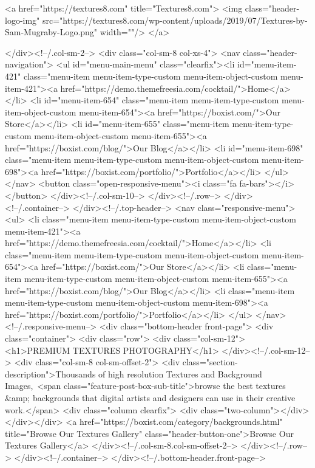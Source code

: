 											<a href="https://textures8.com" title="Textures8.com">
							<img class="header-logo-img" src="https://textures8.com/wp-content/uploads/2019/07/Textures-by-Sam-Mugraby-Logo.png" width=""/>
						</a>
					
				</div><!--/.col-sm-2-->
				<div class="col-sm-8 col-xs-4">
					<nav class="header-navigation">
						<ul id="menu-main-menu" class="clearfix"><li id="menu-item-421" class="menu-item menu-item-type-custom menu-item-object-custom menu-item-421"><a href="https://demo.themefreesia.com/cocktail/">Home</a></li>
<li id="menu-item-654" class="menu-item menu-item-type-custom menu-item-object-custom menu-item-654"><a href="https://boxist.com/">Our Store</a></li>
<li id="menu-item-655" class="menu-item menu-item-type-custom menu-item-object-custom menu-item-655"><a href="https://boxist.com/blog/">Our Blog</a></li>
<li id="menu-item-698" class="menu-item menu-item-type-custom menu-item-object-custom menu-item-698"><a href="https://boxist.com/portfolio/">Portfolio</a></li>
</ul>					</nav>
					<button class="open-responsive-menu"><i class="fa fa-bars"></i></button>
				</div><!--/.col-sm-10-->
			</div><!--/.row-->
		</div><!--/.container-->
	</div><!--/.top-header-->
	<nav class="responsive-menu">
		<ul>
			<li class="menu-item menu-item-type-custom menu-item-object-custom menu-item-421"><a href="https://demo.themefreesia.com/cocktail/">Home</a></li>
<li class="menu-item menu-item-type-custom menu-item-object-custom menu-item-654"><a href="https://boxist.com/">Our Store</a></li>
<li class="menu-item menu-item-type-custom menu-item-object-custom menu-item-655"><a href="https://boxist.com/blog/">Our Blog</a></li>
<li class="menu-item menu-item-type-custom menu-item-object-custom menu-item-698"><a href="https://boxist.com/portfolio/">Portfolio</a></li>
		</ul>
	</nav><!--/.responsive-menu-->
		<div class="bottom-header front-page">
		<div class="container">
			<div class="row">
									<div class="col-sm-12">
						<h1>PREMIUM TEXTURES PHOTOGRAPHY</h1>
					</div><!--/.col-sm-12-->
								<div class="col-sm-8 col-sm-offset-2">
											<div class="section-description">Thousands of high resolution Textures and Background Images, <span class="feature-post-box-sub-title">browse the best textures &amp; backgrounds that digital artists and designers can use in their creative work.</span>
<div class="column clearfix">
<div class="two-column"></div>
</div></div>
																<a href="https://boxist.com/category/backgrounds.html" title="Browse Our Textures Gallery" class="header-button-one">Browse Our Textures Gallery</a>
														</div><!--/.col-sm-8.col-sm-offset-2-->
			</div><!--/.row-->
		</div><!--/.container-->
	</div><!--/.bottom-header.front-page-->

